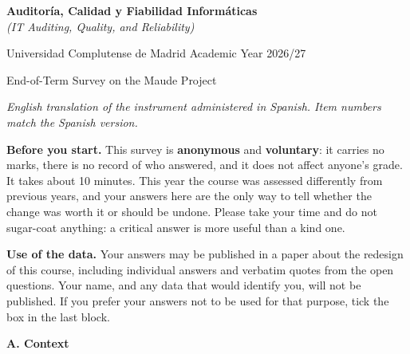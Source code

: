 

\usepackage{url}
\usepackage{hyperref}
\usepackage{array}
\usepackage{enumitem}

\newcommand{\cb}{\ding{113}}
\newcommand{\cbfive}{\cb & \cb & \cb & \cb & \cb}
\newcommand{\cbfour}{\cb & \cb & \cb & \cb}

\newcommand{\bloque}[1]{\bigskip\noindent\textbf{\large #1}\par\nobreak\smallskip}



\begin{center}
{\Large\textbf{Auditor\'ia, Calidad y Fiabilidad Inform\'aticas}}\\[2pt]
\textit{(IT Auditing, Quality, and Reliability)}
\smallskip

\large
Universidad Complutense de Madrid \qquad Academic Year 2026/27
\medskip

End-of-Term Survey on the Maude Project\hfill\mbox{}

\noindent\hrulefill
\end{center}

\noindent
{\small\textit{English translation of the instrument administered in Spanish.
Item numbers match the Spanish version.}}

\medskip
\noindent
\textbf{Before you start.} This survey is \textbf{anonymous} and
\textbf{voluntary}: it carries no marks, there is no record of who answered,
and it does not affect anyone's grade.
%
It takes about 10 minutes.
%
This year the course was assessed differently from previous years, and your
answers here are the only way to tell whether the change was worth it or
should be undone. Please take your time and do not sugar-coat anything: a
critical answer is more useful than a kind one.

\smallskip
\noindent
\textbf{Use of the data.} Your answers may be published in a paper about the
redesign of this course, including individual answers and verbatim quotes
from the open questions. Your name, and any data that would identify you,
will not be published. If you prefer your answers not to be used for that
purpose, tick the box in the last block.

\bloque{A. Context}

